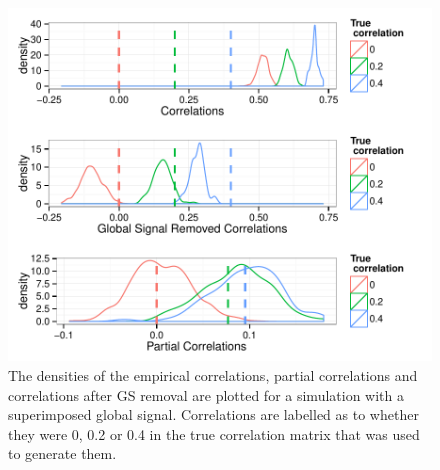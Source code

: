 \documentclass[a4paper]{article}\usepackage[]{graphicx}\usepackage[]{color}
\makeatletter
\def\maxwidth{ %
  \ifdim\Gin@nat@width>\linewidth
    \linewidth
  \else
    \Gin@nat@width
  \fi
}
\newenvironment{knitrout}{}{} %
\makeatother
\begin{document}
\begin{knitrout}
\color{fgcolor}\begin{figure}[]


{\centering \includegraphics[width=\maxwidth]{GSFigs/GSDensityGS} 

}

\caption[The densities of the empirical correlations, partial correlations and correlations after GS removal are plotted for a simulation with a superimposed global signal]{The densities of the empirical correlations, partial correlations and correlations after GS removal are plotted for a simulation with a superimposed global signal. Correlations are labelled as to whether they were 0, 0.2 or 0.4 in the true correlation matrix that was used to generate them.\label{fig:DensityGS}}
\end{figure}


\end{knitrout}
\end{document}
